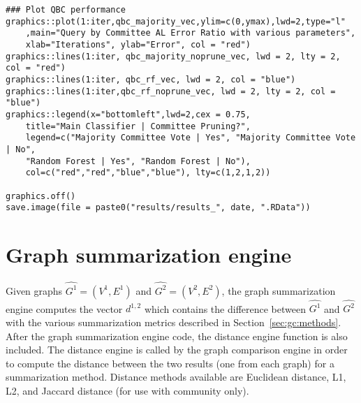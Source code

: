 {\begin{lstlisting}
### Plot QBC performance
graphics::plot(1:iter,qbc_majority_vec,ylim=c(0,ymax),lwd=2,type="l"
	,main="Query by Committee AL Error Ratio with various parameters", 
	xlab="Iterations", ylab="Error", col = "red")
graphics::lines(1:iter, qbc_majority_noprune_vec, lwd = 2, lty = 2, col = "red")
graphics::lines(1:iter, qbc_rf_vec, lwd = 2, col = "blue")
graphics::lines(1:iter,qbc_rf_noprune_vec, lwd = 2, lty = 2, col = "blue")
graphics::legend(x="bottomleft",lwd=2,cex = 0.75,
	title="Main Classifier | Committee Pruning?",
	legend=c("Majority Committee Vote | Yes", "Majority Committee Vote | No",
	"Random Forest | Yes", "Random Forest | No"),
	col=c("red","red","blue","blue"), lty=c(1,2,1,2))

graphics.off()
save.image(file = paste0("results/results_", date, ".RData"))
\end{lstlisting}
}
















\section{Graph summarization engine}
\label{sec:appendicies:gc:engine}

Given graphs $\hat{G^1}=(V^1,E^1)$ and $\hat{G^2}=(V^2,E^2)$, the graph 
summarization engine computes the vector $d^{1,2}$ which 
contains the difference between $\hat{G^1}$ and $\hat{G^2}$ with the various 
summarization metrics described in Section~\ref{sec:gc:methods}. After the 
graph summarization engine code, the distance engine function is also included. 
The distance engine is called by the graph comparison engine in order to 
compute the distance between the two results (one from each graph) for a 
summarization method. Distance methods available are Euclidean distance, L1, 
L2, and Jaccard distance (for use with community only).

